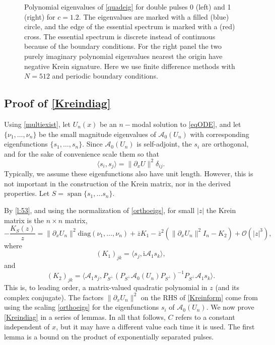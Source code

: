 \documentclass[review,onefignum,onetabnum]{siamart171218}
\newcommand{\R}{\mathbb{R}}
\def\Span{\mathop\mathrm{span}\nolimits}
\newcommand{\rmi}{\mathrm{i}}
\newcommand{\calA}{\mathcal{A}}
\newcommand{\vI}{\bm{\mathit{I}}}
\newcommand{\vK}{\bm{\mathit{K}}}
\begin{document}
\begin{figure}[ht]
\begin{tabular}{cc}
\end{tabular}
\caption{Polynomial eigenvalues of \cref{quadeig} for double pulses 0 (left) and 1 (right) for $c=1.2$. The eigenvalues are marked with a filled (blue) circle, and the edge of the essential spectrum is marked with a (red) cross. The essential spectrum is discrete instead of continuous because of the boundary conditions. For the right panel the two purely imaginary polynomial eigenvalues nearest the origin have negative Krein signature. Here we use finite difference methods with $N = 512$ and periodic boundary conditions.}
\label{fig:quadeigdouble}
\end{figure}

\subsection{Proof of \cref{Kreindiag}}\label{s:kreinproof}

Using \cref{multiexist}, let $U_n(x)$ be an $n-$modal solution to \cref{eqODE}, and let $\{\nu_1, \dots, \nu_n\}$ be the small magnitude eigenvalues of $\calA_0(U_n)$ with corresponding eigenfunctions $\{ s_1, \dots, s_n \}$. Since $\calA_0(U_n)$ is self-adjoint, the $s_i$ are orthogonal, and for the sake of convenience scale them so that
\begin{equation}\label{orthoeigs}
\langle s_i, s_j \rangle = \|\partial_x U \|^2 \delta_{ij}.
\end{equation}
Typically, we assume these eigenfunctions also have unit length. However, this is not important in the construction of the Krein matrix, nor in the derived properties.
Let $S = \Span\{s_1, \dots s_n\}$.

By \cref{l:53}, and using the normalization of \cref{orthoeigs}, for small $|z|$ the Krein matrix is the $n \times n$ matrix,
\begin{equation}\label{Kreinform}
-\frac{\vK_S(z)}{z} = \|\partial_xU_n\|^2 \text{diag}(\nu_1, \dots, \nu_n) + \overline{z}\vK_1
- \overline{z}^2 ( \|\partial_xU_n\|^2\vI_n - \vK_2) + \mathcal{O}(|z|^3),
\end{equation}
where
\begin{equation}\label{defK1}
(\vK_1)_{jk} = \langle s_j, \rmi\calA_1 s_k \rangle,
\end{equation}
and
\begin{equation}\label{defK2}
(\vK_2)_{jk} = \langle \calA_1 s_j, P_{S^\perp}(P_{S^\perp} \calA_0(U_n)P_{S^\perp})^{-1} P_{S^\perp}\calA_1 s_k \rangle.
\end{equation}
This is, to leading order, a matrix-valued quadratic polynomial in $z$ (and its complex conjugate). %
The factors $\|\partial_xU_n\|^2$ on the RHS of \cref{Kreinform} come from using the scaling \cref{orthoeigs} for the eigenfunctions $s_i$ of $\calA_0(U_n)$.
We now prove \cref{Kreindiag} in a series of lemmas. In all that follows, $C$ refers to a constant independent of $x$, but it may have a different value each time it is used. The first lemma is a bound on the product of exponentially separated pulses.
\end{document}
